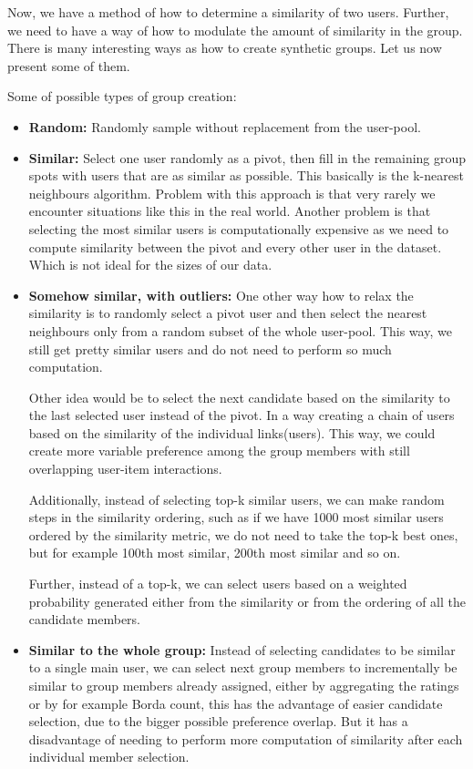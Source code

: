 Now, we have a method of how to determine a similarity of two users. Further, we need to have a way of how to modulate the amount of similarity in the group. There is many interesting ways as how to create synthetic groups. Let us now present some of them.

Some of possible types of group creation:
\begin{itemize}
    \item \textbf{Random:}
        Randomly sample without replacement from the user-pool.
        
    \item \textbf{Similar:}
        Select one user randomly as a pivot, then fill in the remaining group spots with users that are as similar as possible. This basically is the k-nearest neighbours algorithm. Problem with this approach is that very rarely we encounter situations like this in the real world. Another problem is that selecting the most similar users is computationally expensive as we need to compute similarity between the pivot and every other user in the dataset. Which is not ideal for the sizes of our data.
        
    \item \textbf{Somehow similar, with outliers:}
        One other way how to relax the similarity is to randomly select a pivot user and then select the nearest neighbours only from a random subset of the whole user-pool. This way, we still get pretty similar users and do not need to perform so much computation.
        
        Other idea would be to select the next candidate based on the similarity to the last selected user instead of the pivot. In a way creating a chain of users based on the similarity of the individual links(users). This way, we could create more variable preference among the group members with still overlapping user-item interactions.
        
        Additionally, instead of selecting top-k similar users, we can make random steps in the similarity ordering, such as if we have 1000 most similar users ordered by the similarity metric, we do not need to take the top-k best ones, but for example 100th most similar, 200th most similar and so on.
        
        Further, instead of a top-k, we can select users based on a weighted probability generated either from the similarity or from the ordering of all the candidate members.
        
    \item \textbf{Similar to the whole group:}
        Instead of selecting candidates to be similar to a single main user, we can select next group members to incrementally be similar to group members already assigned, either by aggregating the ratings or by for example Borda count, this has the advantage of easier candidate selection, due to the bigger possible preference overlap. But it has a disadvantage of needing to perform more computation of similarity after each individual member selection.
        

\end{itemize}
